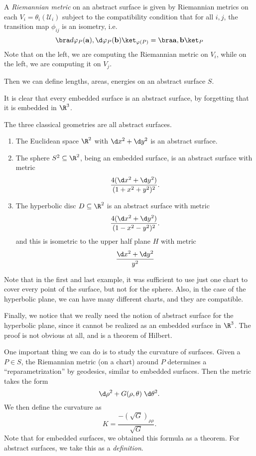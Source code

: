\documentclass[a4paper]{article}
\begin{document}
\begin{defi}
  A \emph{Riemannian metric} on an abstract surface is given by Riemannian metrics on each $V_i = \theta_i(\mathcal{U}_i)$ subject to the compatibility condition that for all $i, j$, the transition map $\phi_{ij}$ is an isometry, i.e.
  \[
    \bra d \varphi_P(\mathbf{a}), \d \varphi_P(\mathbf{b})\ket_{\varphi(P)} = \bra \mathbf{a}, \mathbf{b}\ket_P
  \]
  Note that on the left, we are computing the Riemannian metric on $V_i$, while on the left, we are computing it on $V_j$.
\end{defi}

Then we can define lengths, areas, energies on an abstract surface $S$.

It is clear that every embedded surface is an abstract surface, by forgetting that it is embedded in $\R^3$.
\begin{eg}
  The three classical geometries are all abstract surfaces.
  \begin{enumerate}
    \item The Euclidean space $\R^2$ with $\d x^2 + \d y^2$ is an abstract surface.
    \item The sphere $S^2 \subseteq \R^2$, being an embedded surface, is an abstract surface with metric
      \[
        \frac{4(\d x^2 + \d y^2)}{(1 + x^2 + y^2)^2}.
      \]
    \item The hyperbolic disc $D \subseteq \R^2$ is an abstract surface with metric
      \[
        \frac{4(\d x^2 + \d y^2)}{(1 - x^2 - y^2)^2}.
      \]
      and this is isometric to the upper half plane $H$ with metric
      \[
        \frac{\d x^2 + \d y^2}{y^2}
      \]
  \end{enumerate}
\end{eg}
Note that in the first and last example, it was sufficient to use just one chart to cover every point of the surface, but not for the sphere. Also, in the case of the hyperbolic plane, we can have many different charts, and they are compatible.

Finally, we notice that we really need the notion of abstract surface for the hyperbolic plane, since it cannot be realized as an embedded surface in $\R^3$. The proof is not obvious at all, and is a theorem of Hilbert.

One important thing we can do is to study the curvature of surfaces. Given a $P \in S$, the Riemannian metric (on a chart) around $P$ determines a ``reparametrization'' by geodesics, similar to embedded surfaces. Then the metric takes the form
\[
  \d \rho^2 + G(\rho, \theta) \;\d \theta^2.
\]
We then define the curvature as
\[
  K = \frac{-(\sqrt{G})_{\rho\rho}}{\sqrt{G}}.
\]
Note that for embedded surfaces, we obtained this formula as a theorem. For abstract surfaces, we take this as a \emph{definition}.
\end{document}

